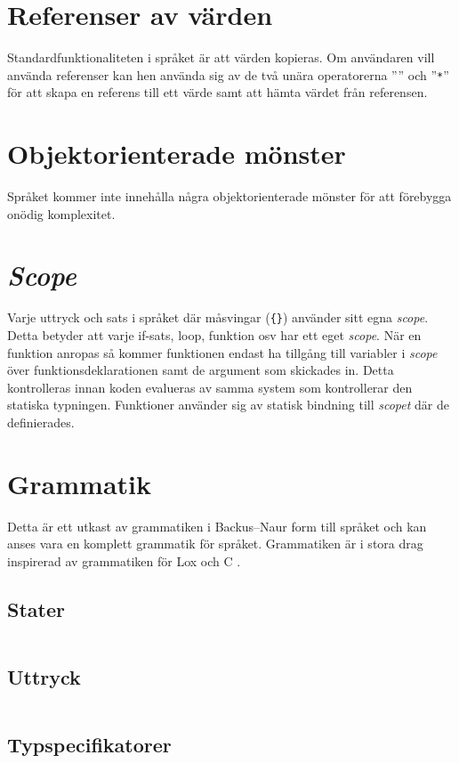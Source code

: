 \documentclass{TDP003mall}
\begin{document}
\section{Referenser av värden}
Standardfunktionaliteten i språket är att värden kopieras. Om användaren vill använda referenser kan hen använda sig av de två unära operatorerna ''\textt{\&}'' och ''\texttt{*}'' för att skapa en referens till ett värde samt att hämta värdet från referensen.

\section{Objektorienterade mönster}
Språket kommer inte innehålla några objektorienterade mönster för att förebygga onödig komplexitet.

\section{\textit{Scope}}
Varje uttryck och sats i språket där måsvingar (\texttt{\{\}}) använder sitt egna \textit{scope}. Detta betyder att varje if-sats, loop, funktion osv har ett eget \textit{scope}. När en funktion anropas så kommer funktionen endast ha tillgång till variabler i \textit{scope} över funktionsdeklarationen samt de argument som skickades in. Detta kontrolleras innan koden evalueras av samma system som kontrollerar den statiska typningen. Funktioner använder sig av statisk bindning till \textit{scopet} där de definierades.

\section{Grammatik}
Detta är ett utkast av grammatiken i Backus–Naur form till språket och kan anses vara en komplett grammatik för språket. Grammatiken är i stora drag inspirerad av grammatiken för Lox \cite{nystrom_crafting_2021} och C \cite{degner_ansi_1995}.

\newpage

\subsection{Stater}
\inputminted{peg}{grammar/statements.bnf}

\subsection{Uttryck}
\inputminted{peg}{grammar/expressions.bnf}

\newpage

\subsection{Typspecifikatorer}
\inputminted{peg}{grammar/type_specifiers.bnf}



\end{document}
